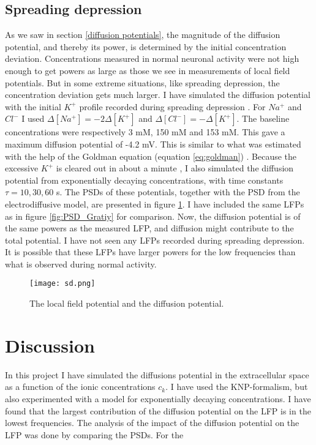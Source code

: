 \documentclass{article}
\begin{document}
\subsection{Spreading depression}\label{SD simulated}

As we saw in section \ref{diffusion potentials}, the magnitude of the diffusion potential, and thereby its power, is determined by the initial concentration deviation. Concentrations measured in normal neuronal activity were not high enough to get powers as large as those we see in measurements of local field potentials. But in some extreme situations, like spreading depression, the concentration deviation gets much larger. I have simulated the diffusion potential with the initial $K^+$ profile recorded during spreading depression \cite{Herreras1993}. For $Na^+$ and $Cl^-$ I used $\Delta [Na^+] = -2\Delta [K^+]$ and $\Delta [Cl^-] = -\Delta[K^+]$. The baseline concentrations were respectively 3 mM, 150 mM and 153 mM. This gave a maximum diffusion potential of -4.2 mV. This is similar to what was estimated with the help of the Goldman equation (equation \ref{eq:goldman}) \cite{Herreras1993}. Because the excessive $K^+$ is cleared out in about a minute \cite{Ataya2015}, I also simulated the diffusion potential from exponentially decaying concentrations, with time constants $\tau = 10, 30, 60 $ s. The PSDs of these potentials, together with the PSD from the electrodiffusive model, are presented in figure \ref{fig:sd}. I have included the same LFPs as in figure \ref{fig:PSD_Gratiy} for comparison. 
Now, the diffusion potential is of the same powers as the measured  LFP, and diffusion might contribute to the total potential. I have not seen any LFPs recorded during spreading depression. It is possible that these LFPs have larger powers for the low frequencies than what is observed during normal activity. 

\begin{figure}
  \texttt{[image: sd.png]}
  \caption{The local field potential and the diffusion potential. }
  \label{fig:sd}
\end{figure}



\section{Discussion}
In this project I have simulated the diffusions potential in the extracellular space as a function of the ionic concentrations $c_k$. I have used the KNP-formalism, but also experimented with a model for exponentially decaying concentrations. I have found that the largest contribution of the diffusion potential on the LFP is in the lowest frequencies. The analysis of the impact of the diffusion potential on the LFP was done by comparing the PSDs. For the 
\end{document}
